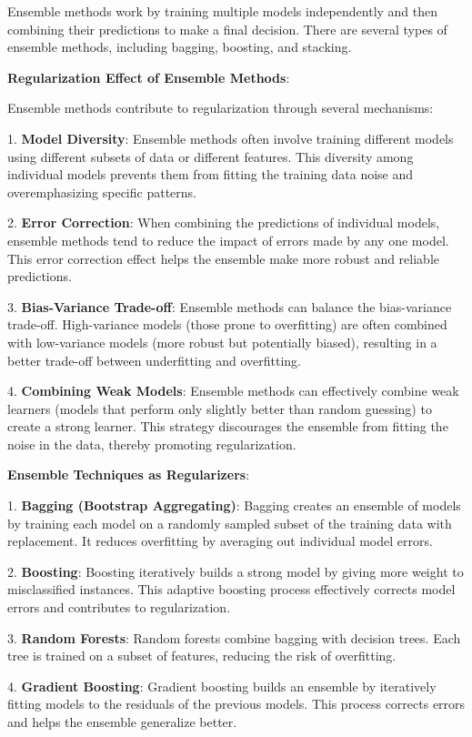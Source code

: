 \documentclass{report}
\begin{document}
Ensemble methods work by training multiple models independently and then combining their predictions to make a final decision. There are several types of ensemble methods, including bagging, boosting, and stacking.

\textbf{Regularization Effect of Ensemble Methods}:

Ensemble methods contribute to regularization through several mechanisms:

1. \textbf{Model Diversity}: Ensemble methods often involve training different models using different subsets of data or different features. This diversity among individual models prevents them from fitting the training data noise and overemphasizing specific patterns.

2. \textbf{Error Correction}: When combining the predictions of individual models, ensemble methods tend to reduce the impact of errors made by any one model. This error correction effect helps the ensemble make more robust and reliable predictions.

3. \textbf{Bias-Variance Trade-off}: Ensemble methods can balance the bias-variance trade-off. High-variance models (those prone to overfitting) are often combined with low-variance models (more robust but potentially biased), resulting in a better trade-off between underfitting and overfitting.

4. \textbf{Combining Weak Models}: Ensemble methods can effectively combine weak learners (models that perform only slightly better than random guessing) to create a strong learner. This strategy discourages the ensemble from fitting the noise in the data, thereby promoting regularization.

\textbf{Ensemble Techniques as Regularizers}:

1. \textbf{Bagging (Bootstrap Aggregating)}: Bagging creates an ensemble of models by training each model on a randomly sampled subset of the training data with replacement. It reduces overfitting by averaging out individual model errors.

2. \textbf{Boosting}: Boosting iteratively builds a strong model by giving more weight to misclassified instances. This adaptive boosting process effectively corrects model errors and contributes to regularization.

3. \textbf{Random Forests}: Random forests combine bagging with decision trees. Each tree is trained on a subset of features, reducing the risk of overfitting.

4. \textbf{Gradient Boosting}: Gradient boosting builds an ensemble by iteratively fitting models to the residuals of the previous models. This process corrects errors and helps the ensemble generalize better.
\end{document}
